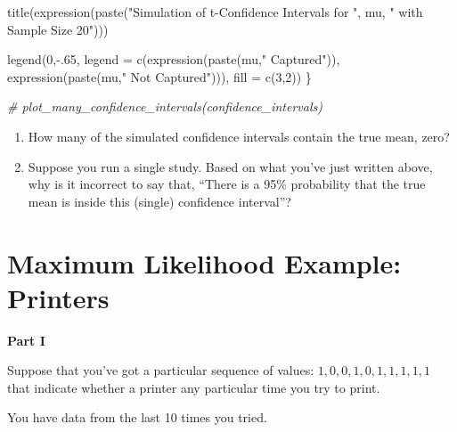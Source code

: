 \documentclass[
]{book}
\newenvironment{Shaded}{\begin{snugshade}}{\end{snugshade}}
\newcommand{\AttributeTok}[1]{\textcolor[rgb]{0.77,0.63,0.00}{#1}}
\newcommand{\CommentTok}[1]{\textcolor[rgb]{0.56,0.35,0.01}{\textit{#1}}}
\newcommand{\DecValTok}[1]{\textcolor[rgb]{0.00,0.00,0.81}{#1}}
\newcommand{\FunctionTok}[1]{\textcolor[rgb]{0.00,0.00,0.00}{#1}}
\newcommand{\NormalTok}[1]{#1}
\newcommand{\SpecialCharTok}[1]{\textcolor[rgb]{0.00,0.00,0.00}{#1}}
\newcommand{\StringTok}[1]{\textcolor[rgb]{0.31,0.60,0.02}{#1}}
\providecommand{\tightlist}{%
  \setlength{\itemsep}{0pt}\setlength{\parskip}{0pt}}
\theoremstyle{definition}
\theoremstyle{definition}
\theoremstyle{definition}
\theoremstyle{definition}
\theoremstyle{remark}
\begin{document}
\begin{Shaded}
\begin{Highlighting}[]
  \FunctionTok{title}\NormalTok{(}\FunctionTok{expression}\NormalTok{(}\FunctionTok{paste}\NormalTok{(}\StringTok{"Simulation of t{-}Confidence Intervals for "}\NormalTok{, mu,}
                          \StringTok{" with Sample Size 20"}\NormalTok{)))}

  \FunctionTok{legend}\NormalTok{(}\DecValTok{0}\NormalTok{,}\SpecialCharTok{{-}}\NormalTok{.}\DecValTok{65}\NormalTok{, }\AttributeTok{legend =} \FunctionTok{c}\NormalTok{(}\FunctionTok{expression}\NormalTok{(}\FunctionTok{paste}\NormalTok{(mu,}\StringTok{" Captured"}\NormalTok{)),}
                             \FunctionTok{expression}\NormalTok{(}\FunctionTok{paste}\NormalTok{(mu,}\StringTok{" Not Captured"}\NormalTok{))), }\AttributeTok{fill =} \FunctionTok{c}\NormalTok{(}\DecValTok{3}\NormalTok{,}\DecValTok{2}\NormalTok{))}
\NormalTok{  \}}
\end{Highlighting}
\end{Shaded}

\begin{Shaded}
\begin{Highlighting}[]
\CommentTok{\# plot\_many\_confidence\_intervals(confidence\_intervals)}
\end{Highlighting}
\end{Shaded}

\begin{enumerate}
\def\labelenumi{\arabic{enumi}.}
\tightlist
\item
  How many of the simulated confidence intervals contain the true mean, zero?\\
\item
  Suppose you run a single study. Based on what you've just written above, why is it incorrect to say that, ``There is a 95\% probability that the true mean is inside this (single) confidence interval''?
\end{enumerate}

\hypertarget{maximum-likelihood-example-printers}{%
\section{Maximum Likelihood Example: Printers}\label{maximum-likelihood-example-printers}}

\textbf{Part I}

Suppose that you've got a particular sequence of values: \({1, 0, 0, 1, 0, 1, 1, 1, 1, 1}\) that indicate whether a printer any particular time you try to print.

You have data from the last 10 times you tried.
\end{document}
